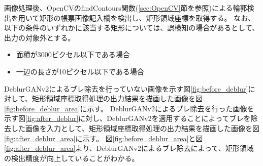 画像処理後、OpenCVのfindContours関数(\ref{sec:OpenCV}節を参照)による輪郭検出を用いて矩形の帳票画像記入欄を検出し、矩形領域座標を取得する。
なお、以下の条件のいずれかに該当する矩形については、誤検知の場合があるとして、出力の対象外とする。

\begin{itemize}
    \item 面積が3000ピクセル以下である場合
    \item 一辺の長さが10ピクセル以下である場合
\end{itemize}

DeblurGANv2によるブレ除去を行っていない画像を示す図\ref{fig:before_deblur}に対して、矩形領域座標取得処理の出力結果を描画した画像を図\ref{fig:before_deblur_area}に示す。
DeblurGANv2によるブレ除去を行った画像を示す図\ref{fig:after_deblur}に対し、DeblurGANv2を適用することによってブレを除去した画像を入力として、矩形領域座標取得処理の出力結果を描画した画像を図\ref{fig:after_deblur_area}に示す。
図\ref{fig:before_deblur_area}と図\ref{fig:after_deblur_area}より、DeblurGANv2によるブレ除去によって、矩形領域の検出精度が向上していることがわかる。

